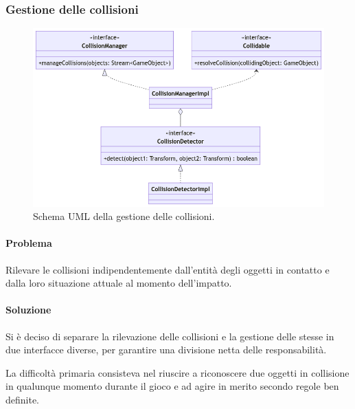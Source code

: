 \documentclass[a4paper,12pt]{report}
\begin{document}
\subsubsection*{Gestione delle collisioni}
%
\begin{figure}[H]
    \centering{}
    \includegraphics[width=\textwidth]{img/Collisions.png}
    \caption{Schema UML della gestione delle collisioni.}
\end{figure}
%
\paragraph*{Problema}
Rilevare le collisioni indipendentemente dall'entità degli oggetti in contatto e dalla loro situazione attuale al momento dell'impatto.
\paragraph*{Soluzione}
Si è deciso di separare la rilevazione delle collisioni e la gestione delle stesse in due interfacce diverse, per garantire una divisione netta delle responsabilità.

La difficoltà primaria consisteva nel riuscire a riconoscere due oggetti in collisione in qualunque momento durante il gioco e ad agire in merito secondo regole ben definite.
\end{document}
